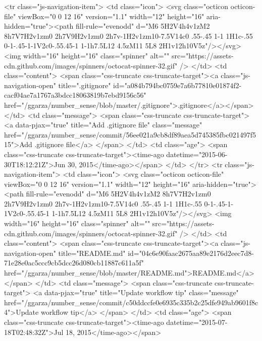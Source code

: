         <tr class="js-navigation-item">
          <td class="icon">
            <svg class="octicon octicon-file" viewBox="0 0 12 16" version="1.1" width="12" height="16" aria-hidden="true"><path fill-rule="evenodd" d="M6 5H2V4h4v1zM2 8h7V7H2v1zm0 2h7V9H2v1zm0 2h7v-1H2v1zm10-7.5V14c0 .55-.45 1-1 1H1c-.55 0-1-.45-1-1V2c0-.55.45-1 1-1h7.5L12 4.5zM11 5L8 2H1v12h10V5z"/></svg>
            <img width="16" height="16" class="spinner" alt="" src="https://assets-cdn.github.com/images/spinners/octocat-spinner-32.gif" />
          </td>
          <td class="content">
            <span class="css-truncate css-truncate-target"><a class="js-navigation-open" title=".gitignore" id="a084b794bc0759e7a6b77810e01874f2-cacf04ae7a1767a3bdcc18063819b7ebd9156c56" href="/ggarza/number_sense/blob/master/.gitignore">.gitignore</a></span>
          </td>
          <td class="message">
            <span class="css-truncate css-truncate-target">
                  <a data-pjax="true" title="Add .gitignore file" class="message" href="/ggarza/number_sense/commit/56ee021a9cb8df89aea5d745385fbc021497f515">Add .gitignore file</a>
            </span>
          </td>
          <td class="age">
            <span class="css-truncate css-truncate-target"><time-ago datetime="2015-06-30T18:12:21Z">Jun 30, 2015</time-ago></span>
          </td>
        </tr>
        <tr class="js-navigation-item">
          <td class="icon">
            <svg class="octicon octicon-file" viewBox="0 0 12 16" version="1.1" width="12" height="16" aria-hidden="true"><path fill-rule="evenodd" d="M6 5H2V4h4v1zM2 8h7V7H2v1zm0 2h7V9H2v1zm0 2h7v-1H2v1zm10-7.5V14c0 .55-.45 1-1 1H1c-.55 0-1-.45-1-1V2c0-.55.45-1 1-1h7.5L12 4.5zM11 5L8 2H1v12h10V5z"/></svg>
            <img width="16" height="16" class="spinner" alt="" src="https://assets-cdn.github.com/images/spinners/octocat-spinner-32.gif" />
          </td>
          <td class="content">
            <span class="css-truncate css-truncate-target"><a class="js-navigation-open" title="README.md" id="04c6e90faac2675aa89e2176d2eec7d8-71e28e0ac5ccc9cb5dcc26d080cb11887c611a5f" href="/ggarza/number_sense/blob/master/README.md">README.md</a></span>
          </td>
          <td class="message">
            <span class="css-truncate css-truncate-target">
                  <a data-pjax="true" title="Update workflow tip" class="message" href="/ggarza/number_sense/commit/c50ddccfe0e6935c335b2c25dfe949ab9601f8c4">Update workflow tip</a>
            </span>
          </td>
          <td class="age">
            <span class="css-truncate css-truncate-target"><time-ago datetime="2015-07-18T02:48:32Z">Jul 18, 2015</time-ago></span>
